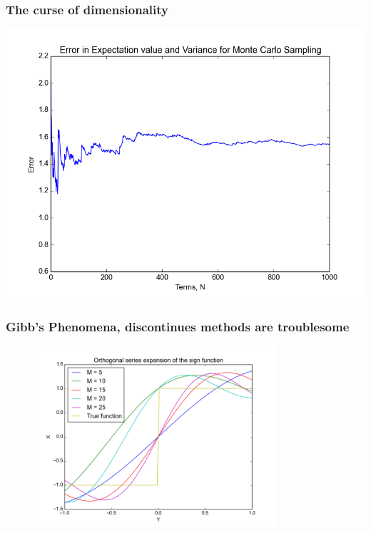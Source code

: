 \documentclass[handout]{beamer}
\begin{document}
 
 
 
 
 
 

\begin{frame}
  \frametitle{The curse of dimensionality}
  \includegraphics[height = 0.9\textheight]{dimensionality.png}

\end{frame}


\begin{frame}
  \frametitle{Gibb's Phenomena, discontinues methods are troublesome}
  \begin{figure}
  \includegraphics[width=0.8\textwidth]{gibbs.png}
  \end{figure}

  \end{frame}
\end{document}
